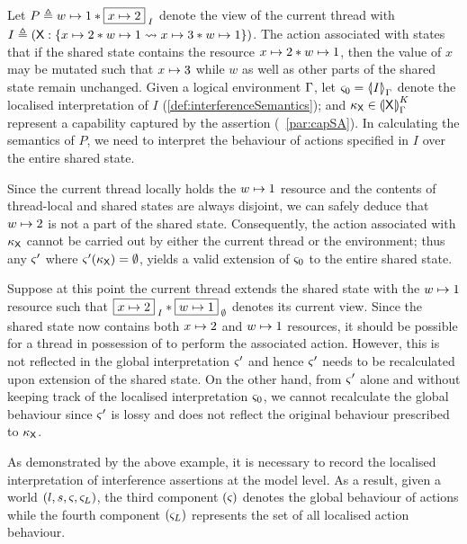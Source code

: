 \begin{example}[]Let $P \eqdef \cell{w}{1} * \shared{\cell{x}{2}}{I}$ denote the view of the current thread with $I \eqdef \left(\token{X}: \left\{\cell{x}{2} * \cell{w}{1} \swap \cell{x}{3} * \cell{w}{1}\right\}\right)$. The action associated with  states that if the shared state contains the resource $\cell{x}{2} * \cell{w}{1}$, then the value of $x$ may be mutated such that $\cell{x}{3}$ while $w$ as well as other parts of the shared state remain unchanged. Given a logical environment $\lenv$, let $\amod{0} = \semI[\lenv]{I}$ denote the localised interpretation of $I$ (\ref{def:interferenceSemantics}); and $\ca{\textsf{X}} \in  \semK[\lenv]{\token{X}}$ represent a capability captured by the assertion  (\param~\ref{par:capSA}). In calculating the semantics of $P$, we need to interpret the behaviour of actions specified in $I$ over the entire shared state.

Since the current thread locally holds the $\cell{w}{1}$ resource and the contents of thread-local and shared states are always disjoint, we can safely deduce that $\cell{w}{2}$ is not a part of the shared state. Consequently, the action associated with $\ca{\textsf{X}}$ cannot be carried out by either the current thread or the environment; thus any $\amod{}'$ where $\amod{}'(\ca{\textsf{X}}) = \emptyset$, yields a valid extension of $\amod{0}$ to the entire shared state.

Suppose at this point the current thread extends the shared state with the $\cell{w}{1}$ resource such that $\shared{\cell{x}{2}}{I} * \shared{\cell{w}{1}}{\emptyset}$ denotes its current view. Since the shared state now contains both $\cell{x}{2}$ and $\cell{w}{1}$ resources, it should be possible for a thread in possession of  to perform the associated action. However, this is not reflected in the global interpretation $\amod{}'$ and hence $\amod{}'$ needs to be recalculated upon extension of the shared state. On the other hand, from $\amod{}'$ alone and without keeping track of the localised interpretation $\amod{0}$, we cannot recalculate the global behaviour since $\amod{}'$ is lossy and does not reflect the original behaviour prescribed to $\ca{\textsf{X}}$.
\end{example}
%
%
As demonstrated by the above example, it is necessary to record the localised interpretation of interference assertions at the model level. As a result, given a world $(l, s, \amod{}, \amod{L})$, the third component $(\amod{})$ denotes the global behaviour of actions while the fourth component $(\amod{L})$ represents the set of all localised action behaviour.
